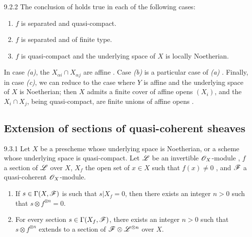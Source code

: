 \begin{envs}[Corollary]{9.2.2}
\label{cor-1.9.2.2}
The conclusion of  holds true in each of the following cases:
\begin{enumerate}[label=\rm{(\alph*)}]
  \item $f$ is separated and quasi-compact.
  \item $f$ is separated and of finite type.
  \item $f$ is quasi-compact and the underlying space of $X$ is locally Noetherian.
\end{enumerate}
\end{envs}

In case \emph{(a)}, the $X_{\alpha i}\cap X_{\alpha j}$ are affine .
Case \emph{(b)} is a particular case of \emph{(a)} . Finally, in case
\emph{(c)}, we can reduce to the case where $Y$ is affine and the underlying
space of $X$ is Noetherian; then $X$ admits a finite cover of affine opens
$(X_i)$, and the $X_i\cap X_j$, being quasi-compact, are finite unions of affine
opens .

\subsection{Extension of sections of quasi-coherent sheaves}
\label{1-schemes-9.3}

\begin{envs}[Theorem]{9.3.1}
\label{thm-1.9.3.1}
Let $X$ be a prescheme whose underlying space is Noetherian, or a scheme whose underlying
space is quasi-compact. Let $\mathscr{L}$ be an invertible $\mathscr{O}_X$-module , $f$ a
section of $\mathscr{L}$ over $X$, $X_f$ the open set of $x\in X$ such that $f(x)\neq0$
, and $\mathscr{F}$ a quasi-coherent $\mathscr{O}_X$-module.
\begin{enumerate}[label=\rm{(\roman*)}]
  \item If $s\in\Gamma(X,\mathscr{F})$ is such that $s|X_f=0$, then there exists an integer $n>0$
        such that $s\otimes f^{\otimes n}=0$.
  \item For every section $s\in\Gamma(X_f,\mathscr{F})$, there exists an integer $n>0$ such that
        $s\otimes f^{\otimes n}$ extends to a section of $\mathscr{F}\otimes\mathscr{L}^{\otimes n}$
        over $X$.
\end{enumerate}
\end{envs}

